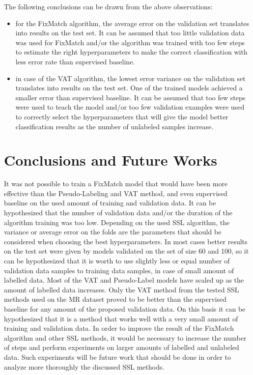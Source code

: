 \documentclass[12pt]{article}
\theoremstyle{definition}
\DeclareRobustCommand{\[}{\begin{equation}}
\DeclareRobustCommand{\]}{\end{equation}}
\begin{document}
\vspace{5mm} %
The following conclusions can be drawn from the above observations:
    \begin{itemize}
        \item for the FixMatch algorithm, the average error on the validation set translates into results on the test set. It can be assumed that too little validation data was used for FixMatch and/or the algorithm was trained with too few steps to estimate the right hyperparameters to make the correct classification with less error rate than supervised baseline.
        \item in case of the VAT algorithm, the lowest error variance on the validation set translates into results on the test set. One of the trained models achieved a smaller error than supervised baseline. It can be assumed that too few steps were used to teach the model and/or too few validation examples were used to correctly select the hyperparameters that will give the model better classification results as the number of  unlabeled samples increase.
    \end{itemize}

\section{Conclusions and Future Works}
It was not possible to train a FixMatch model that would have been more effective than the Pseudo-Labeling and VAT method, and even supervised baseline on the used amount of training and validation data. It can be hypothesized that the number of validation data and/or the duration of the algorithm training was too low.
Depending on the used SSL algorithm, the variance or average error on the folds are the parameters that should be considered when choosing the best hyperparameters. In most cases better results on the test set were given by models validated on the set of size 60 and 100, so it can be hypothesized that it is worth to use slightly less or equal number of validation data samples to training data samples, in case of small amount of labelled data.
Most of the VAT and Pseudo-Label models have scaled up as the amount of labelled data increases.
Only the VAT method from the tested SSL methods used on the MR dataset proved to be better than the supervised baseline for any amount of the proposed validation data. On this basis it can be hypothesized that it is a method that works well with a very small amount of training and validation data.
In order to improve the result of the FixMatch algorithm and other SSL methods, it would be necessary to increase the number of steps and perform experiments on larger amounts of labelled and unlabeled data. Such experiments will be future work that should be done in order to analyze more thoroughly the discussed SSL methods.

\medskip



\end{document}

